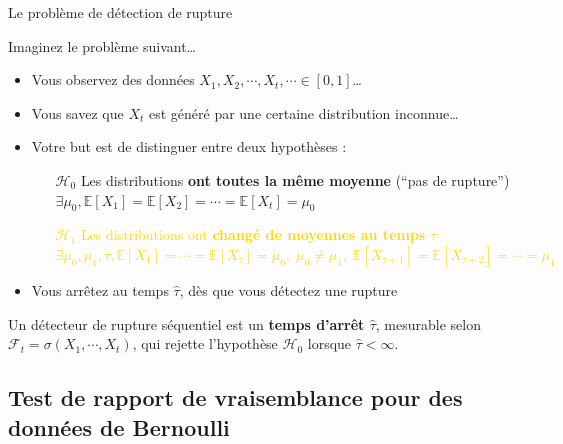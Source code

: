 \documentclass[11pt,french,ignorenonframetext,]{beamer}
\begin{document}
\begin{frame}{Le problème de détection de rupture}

  Imaginez le problème suivant\ldots

  \begin{itemize}
    \item Vous observez des données $X_1,X_2,\cdots,X_t,\cdots \in[0,1]$\ldots
    \item Vous savez que $X_t$ est généré par une certaine distribution \alert{inconnue}\ldots

    \pause
    \item \alert{Votre but} est de distinguer entre deux hypothèses :
    \begin{itemize}
      \item[\textcolor{deeppurple}{$\mathcal{H}_0$}] \textcolor{deeppurple}{Les distributions \textbf{ont toutes la même moyenne} \hfill{} (``pas de rupture'')\\
      $\exists \mu_0, \mathbb{E}[X_1] = \mathbb{E}[X_2] = \cdots = \mathbb{E}[X_t] = \mu_0$}

      \item[\textcolor{gold}{$\mathcal{H}_1$}] \textcolor{gold}{Les distributions ont \textbf{changé de moyennes au temps $\tau$} \\
      $\exists \mu_0, \mu_1, \tau, \mathbb{E}[X_1] = \cdots = \mathbb{E}[X_{\tau}] = \mu_0, \; \mu_0 \neq \mu_1, \; \mathbb{E}[X_{\tau+1}] = \mathbb{E}[X_{\tau+2}] = \cdots = \mu_1$}
    \end{itemize}
    \item Vous arrêtez au temps $\widehat{\tau}$, dès que vous détectez une rupture
  \end{itemize}

  \pause
  Un \alert{détecteur de rupture séquentiel} est un \alert{\textbf{temps d'arrêt $\widehat{\tau}$}},
  mesurable selon $\mathcal{F}_t = \sigma(X_1,\cdots,X_t)$,
  qui rejette l'hypothèse \textcolor{deeppurple}{$\mathcal{H}_0$}
  lorsque $\widehat{\tau} < \infty$.

\end{frame}


\subsection{\hfill{}Test de rapport de vraisemblance pour des données de Bernoulli\hfill{}}
\end{document}
